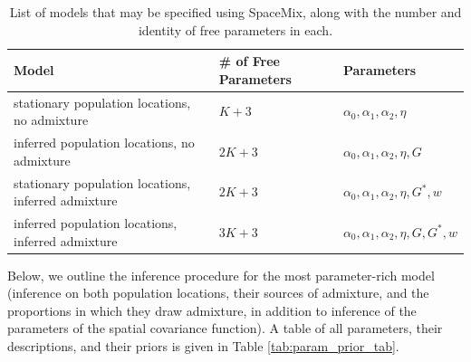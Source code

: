 \documentclass[12pt]{article}
\newcommand{\identifyadmixsource}[1]{{#1^{*}}}
\begin{document}
\begin{centering}
\begin{table}
\begin{tabular}{| >{\centering\arraybackslash}m{6cm} | >{\centering\arraybackslash}m{3cm} | l |}
	\hline
	\textbf{Model} & \textbf{\# of Free Parameters} & \textbf{Parameters}\\ \hline
	stationary population locations, no admixture & $K + 3$	& $\alpha_0,\alpha_1,\alpha_2,\eta$	\\ \hline
	inferred population locations, \hspace{0.5cm}no admixture & $2K + 3$	& $\alpha_0,\alpha_1,\alpha_2,\eta,G$	\\ \hline
	stationary population locations, inferred admixture & $2K + 3$	& $\alpha_0,\alpha_1,\alpha_2,\eta,\identifyadmixsource{G},w$	\\ \hline
	inferred population locations, inferred admixture & $3K + 3$	&$\alpha_0,\alpha_1,\alpha_2,\eta,G,\identifyadmixsource{G},w$	\\
	\hline
\end{tabular}
\caption{
    List of models that may be specified using SpaceMix, along with the number and identity of free parameters in each.
}\label{tab:model_options}
\end{table}
\end{centering}

Below, we outline the inference procedure for the most parameter-rich model (inference on both population locations, their sources of admixture, and the proportions in which they draw admixture, in addition to inference of the parameters of the spatial covariance function).
A table of all parameters, their descriptions, and their priors is given in Table \ref{tab:param_prior_tab}.
\end{document}
